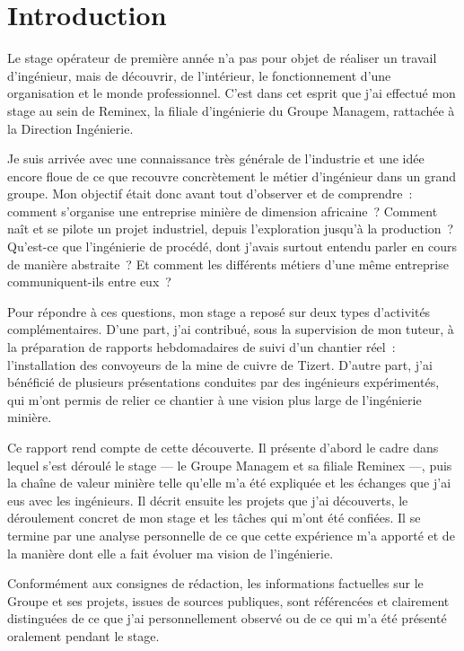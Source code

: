 \chapter*{Introduction}

Le stage opérateur de première année n'a pas pour objet de réaliser un travail d'ingénieur, mais de découvrir, de l'intérieur, le fonctionnement d'une organisation et le monde professionnel. C'est dans cet esprit que j'ai effectué mon stage au sein de Reminex, la filiale d'ingénierie du Groupe Managem, rattachée à la Direction Ingénierie.

Je suis arrivée avec une connaissance très générale de l'industrie et une idée encore floue de ce que recouvre concrètement le métier d'ingénieur dans un grand groupe. Mon objectif était donc avant tout d'observer et de comprendre~: comment s'organise une entreprise minière de dimension africaine~? Comment naît et se pilote un projet industriel, depuis l'exploration jusqu'à la production~? Qu'est-ce que l'ingénierie de procédé, dont j'avais surtout entendu parler en cours de manière abstraite~? Et comment les différents métiers d'une même entreprise communiquent-ils entre eux~?

Pour répondre à ces questions, mon stage a reposé sur deux types d'activités complémentaires. D'une part, j'ai contribué, sous la supervision de mon tuteur, à la préparation de rapports hebdomadaires de suivi d'un chantier réel~: l'installation des convoyeurs de la mine de cuivre de Tizert. D'autre part, j'ai bénéficié de plusieurs présentations conduites par des ingénieurs expérimentés, qui m'ont permis de relier ce chantier à une vision plus large de l'ingénierie minière.

Ce rapport rend compte de cette découverte. Il présente d'abord le cadre dans lequel s'est déroulé le stage --- le Groupe Managem et sa filiale Reminex ---, puis la chaîne de valeur minière telle qu'elle m'a été expliquée et les échanges que j'ai eus avec les ingénieurs. Il décrit ensuite les projets que j'ai découverts, le déroulement concret de mon stage et les tâches qui m'ont été confiées. Il se termine par une analyse personnelle de ce que cette expérience m'a apporté et de la manière dont elle a fait évoluer ma vision de l'ingénierie.

Conformément aux consignes de rédaction, les informations factuelles sur le Groupe et ses projets, issues de sources publiques, sont référencées et clairement distinguées de ce que j'ai personnellement observé ou de ce qui m'a été présenté oralement pendant le stage.
